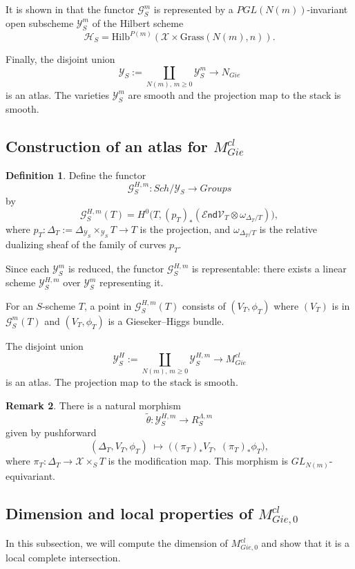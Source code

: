 \documentclass[11pt]{amsart}
\newcommand {\End} {\mathcal E\mathsf{nd}}
\theoremstyle{plain}
\numberwithin{equation}{section}
\theoremstyle{definition}
\newtheorem{Def}{Definition}[section]
\newtheorem{Rem}[Def]{Remark}
\theoremstyle{plain}
\begin{document}
It is shown in \cite[Proposition 8]{25} that the functor $\mathcal{G}^{m}_S$ is represented by a $PGL(N(m))$-invariant open subscheme $\mathcal{Y}^{m}_S$ of the Hilbert scheme
\[
\mathcal{H}_S = \mathrm{Hilb}^{P(m)}(\mathcal{X} \times \mathrm{Grass}(N(m),n)).
\]

Finally, the disjoint union
\[
\mathcal{Y}_S := \coprod_{N(m),\, m \geq 0} \mathcal{Y}^{m}_S \longrightarrow N_{Gie}
\]
is an atlas. The varieties $\mathcal{Y}^{m}_S$ are smooth and the projection map to the stack is smooth.

\subsection{Construction of an atlas for $M^{cl}_{Gie}$}\label{at2}

\begin{Def}\label{Ydef}
Define the functor
\[
\mathcal{G}^{H,m}_S : {Sch}/\mathcal{Y}_S \longrightarrow {Groups}
\]
by
\[
\mathcal{G}^{H,m}_S(T) = H^0\bigl(T, (p_T)_*(\End \mathcal{V}_T \otimes \omega_{\Delta_T/T})\bigr),
\]
where $p_T : \Delta_T := \Delta_{\mathcal{Y}_S} \times_{\mathcal{Y}_S} T \to T$ is the projection, and $\omega_{\Delta_T/T}$ is the relative dualizing sheaf of the family of curves $p_T$.
\end{Def}

Since each $\mathcal{Y}^m_S$ is reduced, the functor $\mathcal{G}^{H,m}_S$ is representable: there exists a linear scheme $\mathcal{Y}^{H,m}_S$ over $\mathcal{Y}^m_S$ representing it.

For an $S$-scheme $T$, a point in $\mathcal{G}^{H,m}_S(T)$ consists of $(V_T, \phi_T)$ where $(V_T)$ is in $\mathcal{G}^m_S(T)$ and $(V_T, \phi_T)$ is a Gieseker–Higgs bundle.

The disjoint union
\[
\mathcal{Y}^H_S := \coprod_{N(m),\, m \geq 0} \mathcal{Y}^{H,m}_S \longrightarrow M^{cl}_{Gie}
\]
is an atlas. The projection map to the stack is smooth.

\begin{Rem}\label{equivar}
There is a natural morphism
\[
\tilde{\theta} : \mathcal{Y}^{H,m}_S \longrightarrow R^{\Lambda,m}_S
\]
given by pushforward
\[
(\Delta_T, V_T, \phi_T) \;\longmapsto\; \bigl( (\pi_T)_* V_T,\; (\pi_T)_* \phi_T \bigr),
\]
where $\pi_T : \Delta_T \to \mathcal{X} \times_S T$ is the modification map. This morphism is $GL_{N(m)}$-equivariant.
\end{Rem}

\medskip

\subsection{\textbf{Dimension and local properties of \texorpdfstring{$M^{cl}_{Gie,0}$}{MclGie0}}}
In this subsection, we will compute the dimension of $M^{cl}_{Gie,0}$ and show that it is a local complete intersection. 
\end{document}
